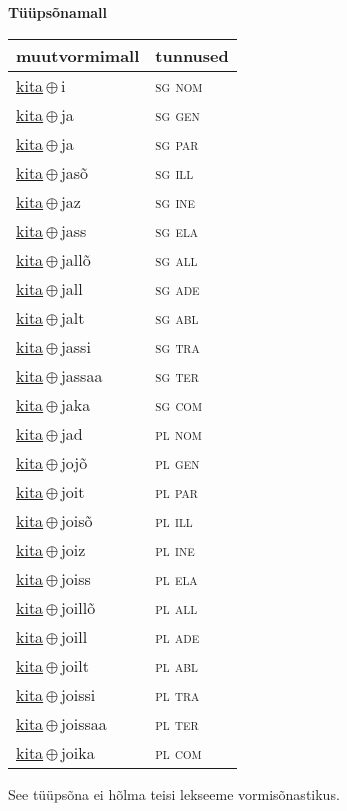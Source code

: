 

\vspace{3.5em}
\noindent \begin{minipage}{\textwidth}
\noindent \textbf{Tüüpsõnamall \,}\\

\begin{sideways}
\begin{tabular}{l l}
muutvormimall & tunnused \\
\hline
\underline{kita}\,$\oplus$\,i & \textsc{ sg nom } \\
\underline{kita}\,$\oplus$\,ja & \textsc{ sg gen } \\
\underline{kita}\,$\oplus$\,ja & \textsc{ sg par } \\
\underline{kita}\,$\oplus$\,jasõ & \textsc{ sg ill } \\
\underline{kita}\,$\oplus$\,jaz & \textsc{ sg ine } \\
\underline{kita}\,$\oplus$\,jass & \textsc{ sg ela } \\
\underline{kita}\,$\oplus$\,jallõ & \textsc{ sg all } \\
\underline{kita}\,$\oplus$\,jall & \textsc{ sg ade } \\
\underline{kita}\,$\oplus$\,jalt & \textsc{ sg abl } \\
\underline{kita}\,$\oplus$\,jassi & \textsc{ sg tra } \\
\underline{kita}\,$\oplus$\,jassaa & \textsc{ sg ter } \\
\underline{kita}\,$\oplus$\,jaka & \textsc{ sg com } \\
\underline{kita}\,$\oplus$\,jad & \textsc{ pl nom } \\
\underline{kita}\,$\oplus$\,jojõ & \textsc{ pl gen } \\
\underline{kita}\,$\oplus$\,joit & \textsc{ pl par } \\
\underline{kita}\,$\oplus$\,joisõ & \textsc{ pl ill } \\
\underline{kita}\,$\oplus$\,joiz & \textsc{ pl ine } \\
\underline{kita}\,$\oplus$\,joiss & \textsc{ pl ela } \\
\underline{kita}\,$\oplus$\,joillõ & \textsc{ pl all } \\
\underline{kita}\,$\oplus$\,joill & \textsc{ pl ade } \\
\underline{kita}\,$\oplus$\,joilt & \textsc{ pl abl } \\
\underline{kita}\,$\oplus$\,joissi & \textsc{ pl tra } \\
\underline{kita}\,$\oplus$\,joissaa & \textsc{ pl ter } \\
\underline{kita}\,$\oplus$\,joika & \textsc{ pl com } \\
\end{tabular}
\end{sideways}
\label{tab:tüüpsõnamall-kitai}

\end{minipage}

 
\vspace{1em}
\noindent See tüüpsõna ei hõlma teisi lekseeme vormi\-sõnastikus.
